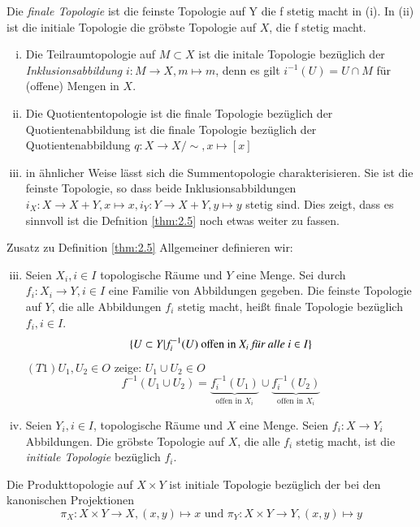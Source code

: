 \documentclass[a4paper,10pt]{scrartcl}
\begin{document}
\begin{note*}
Die \emph{finale Topologie} ist die feinste Topologie auf Y die f stetig macht in (i). In (ii) ist die initiale Topologie die gröbste Topologie auf $ X $, die f stetig macht.
\end{note*}
\begin{exs*}
\begin{enumerate}[(i)]
\item Die Teilraumtopologie auf $M\subset X$ ist die initale Topologie bezüglich der \emph{Inklusionsabbildung} $ i:M\to X,m\mapsto m $, denn es gilt $ i^{-1}(U)=U\cap M $ für (offene) Mengen in $ X $.
\item Die Quotiententopologie ist die finale Topologie bezüglich der Quotientenabbildung ist die finale Topologie bezüglich der Quotientenabbildung $ q: X\to X/\sim, x\mapsto [x] $
\item in ähnlicher Weise lässt sich die Summentopologie charakterisieren.  Sie ist die feinste Topologie, so dass beide Inklusionsabbildungen
$ i_X:X\to X+Y, x \mapsto x, i_Y: Y\to X+Y,y\mapsto y $ stetig sind.  Dies zeigt, dass es sinnvoll ist die Defnition \ref{thm:2.5} noch etwas weiter zu fassen.
\end{enumerate}
\end{exs*}
\begin{seg}{Zusatz zu Definition \ref{thm:2.5}}\label{thm:2.5(2)}
Allgemeiner definieren wir:
\begin{enumerate}[(i)]
\setcounter{enumi}{2}
\item Seien $X_i, i\in I$ topologische Räume und $ Y $ eine Menge. Sei durch $f_i:X_i\to Y, i\in I$ eine Familie von Abbildungen gegeben. Die feinste Topologie auf $ Y $, die alle Abbildungen $f_i$ stetig macht, heißt finale Topologie bezüglich $ f_i,i\in I $.
\[
\{U\subset Y|f^{-1}_i(U) \text{ offen in }X_i \text{ \emph{für alle} } i\in I\}
\]
$(T1) U_1, U_2\in O$ zeige: $U_1\cup U_2\in O$
\[f^{-1}(U_1\cup U_2)=\underbrace{f^{-1}_i(U_1)}_{\text{offen in } X_i}\cup \underbrace{f^{-1}_i(U_2)}_{\text{offen in } X_i}\]
\item Seien $ Y_i, i\in I $, topologische Räume und $ X $ eine Menge.  Seien $ f_i: X\to Y_i $ Abbildungen.  Die gröbste Topologie auf $ X $, die alle $f_i$ stetig macht, ist die \emph{initiale Topologie} bezüglich $f_i$. 
\end{enumerate}
\end{seg}
\begin{ex*}
Die Produkttopologie auf $ X\times Y $ ist initiale Topologie bezüglich der bei den kanonischen Projektionen
\[
\pi_X:X\times Y \to X, (x,y)\mapsto x \text{ und } \pi_Y: X\times Y\to Y, (x,y)\mapsto y 
\]
\end{ex*}
\end{document}
